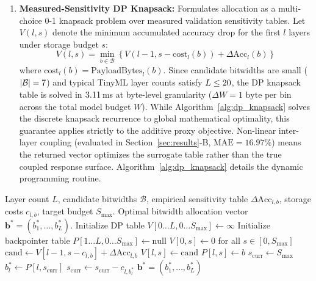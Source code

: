 \documentclass{ieeeaccess}
\begin{document}
\begin{enumerate}
    \item \textbf{Measured-Sensitivity DP Knapsack:} Formulates allocation as a multi-choice 0-1 knapsack problem over measured validation sensitivity tables. Let $V(l, s)$ denote the minimum accumulated accuracy drop for the first $l$ layers under storage budget $s$:
    \begin{equation}
    \label{eq:dp_recurrence}
    V(l, s) = \min_{b \in \mathcal{B}} \left\{ V(l-1, s - \text{cost}_l(b)) + \Delta \text{Acc}_l(b) \right\}
    \end{equation}
    where $\text{cost}_l(b) = \text{PayloadBytes}_l(b)$. Since candidate bitwidths are small ($|\mathcal{B}| = 7$) and typical TinyML layer counts satisfy $L \le 20$, the DP knapsack table is solved in $3.11$\,ms at byte-level granularity ($\Delta W = 1\text{ byte per bin}$ across the total model budget $W$). While Algorithm~\ref{alg:dp_knapsack} solves the discrete knapsack recurrence to global mathematical optimality, this guarantee applies strictly to the additive proxy objective. Non-linear inter-layer coupling (evaluated in Section~\ref{sec:results}-B, $\text{MAE} = 16.97\%$) means the returned vector optimizes the surrogate table rather than the true coupled response surface. Algorithm~\ref{alg:dp_knapsack} details the dynamic programming routine.
\end{enumerate}

\begin{algorithm}[t]
\caption{Measured-Sensitivity Multi-Choice 0-1 DP Knapsack Bit Allocation}
\label{alg:dp_knapsack}
\begin{algorithmic}[1]
\REQUIRE Layer count $L$, candidate bitwidths $\mathcal{B}$, empirical sensitivity table $\Delta \text{Acc}_{l, b}$, storage costs $c_{l, b}$, target budget $S_{\text{max}}$.
\ENSURE Optimal bitwidth allocation vector $\mathbf{b}^* = (b_1^*, \dots, b_L^*)$.
\STATE Initialize DP table $V[0 \dots L, 0 \dots S_{\text{max}}] \leftarrow \infty$
\STATE Initialize backpointer table $P[1 \dots L, 0 \dots S_{\text{max}}] \leftarrow \text{null}$
\STATE $V[0, s] \leftarrow 0$ for all $s \in [0, S_{\text{max}}]$
                \STATE $\text{cand} \leftarrow V[l-1, s - c_{l, b}] + \Delta \text{Acc}_{l, b}$
                    \STATE $V[l, s] \leftarrow \text{cand}$
                    \STATE $P[l, s] \leftarrow b$
                \ENDIF
            \ENDIF
        \ENDFOR
    \ENDFOR
\ENDFOR
\STATE $s_{\text{curr}} \leftarrow S_{\text{max}}$
    \STATE $b_l^* \leftarrow P[l, s_{\text{curr}}]$
    \STATE $s_{\text{curr}} \leftarrow s_{\text{curr}} - c_{l, b_l^*}$
\ENDFOR
\RETURN $\mathbf{b}^* = (b_1^*, \dots, b_L^*)$
\end{algorithmic}
\end{algorithm}
\end{document}
